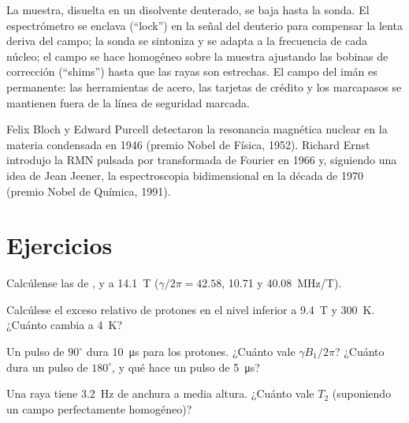 \begin{inthelab}
La muestra, disuelta en un disolvente deuterado, se baja hasta la sonda.
El espectrómetro se enclava (``lock'') en la señal del deuterio para compensar la lenta deriva del
campo; la sonda se sintoniza y se adapta a la frecuencia de cada núcleo;
el campo se hace homogéneo sobre la muestra ajustando las bobinas de corrección (``shims'')
hasta que las rayas son estrechas. El campo del imán es permanente: las herramientas de acero,
las tarjetas de crédito y los marcapasos se mantienen fuera de la línea de seguridad marcada.
\end{inthelab}

\begin{history}
Felix Bloch y Edward Purcell detectaron la resonancia magnética nuclear en la materia
condensada en 1946 (premio Nobel de Física, 1952). Richard Ernst introdujo la RMN pulsada
por transformada de Fourier en 1966 y, siguiendo una idea de Jean Jeener,
la espectroscopia bidimensional en la década de 1970 (premio Nobel de Química, 1991).
\end{history}

\section{Ejercicios}

\begin{exercise}[$\star$]\label{exo:b3:advanced-nmr:1}
Calcúlense las  de ,  y  a \qty{14.1}{T}
($\gamma/2\pi = 42.58$, 10.71 y \qty{40.08}{MHz/T}).
\end{exercise}

\begin{exercise}[$\star$]\label{exo:b3:advanced-nmr:2}
Calcúlese el exceso relativo de protones en el nivel inferior a \qty{9.4}{T} y
\qty{300}{K}. ¿Cuánto cambia a \qty{4}{K}?
\end{exercise}

\begin{exercise}[$\star$]\label{exo:b3:advanced-nmr:3}
Un pulso de $90^\circ$ dura \qty{10}{\micro s} para los protones. ¿Cuánto vale $\gamma B_1/2\pi$? ¿Cuánto dura un
pulso de $180^\circ$, y qué hace un pulso de \qty{5}{\micro s}?
\end{exercise}

\begin{exercise}[$\star$]\label{exo:b3:advanced-nmr:4}
Una raya tiene \qty{3.2}{Hz} de anchura a media altura. ¿Cuánto vale $T_2$ (suponiendo un campo
perfectamente homogéneo)?
\end{exercise}

